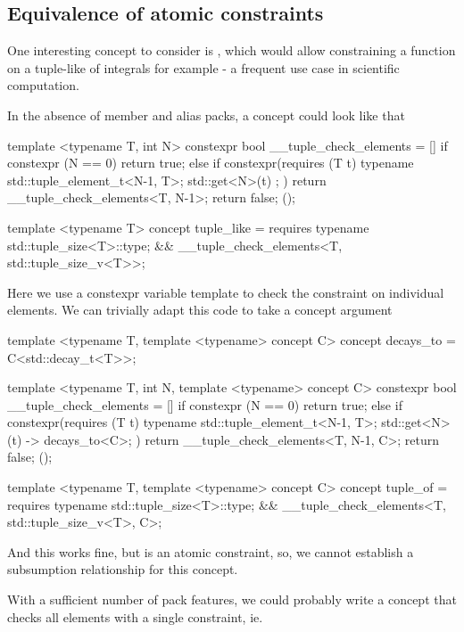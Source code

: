\documentclass{wg21}
\begin{document}
\subsection{Equivalence of atomic constraints}

One interesting concept to consider is , which would allow constraining a function on a tuple-like of integrals for example - a frequent use case in scientific computation.

In the absence of member and alias packs, a  concept could look like that

\begin{colorblock}
template <typename T, int N>
constexpr bool __tuple_check_elements = [] {
    if constexpr (N == 0)
      return true;
    else if constexpr(requires (T t) {
        typename std::tuple_element_t<N-1, T>;
        { std::get<N>(t) };
    })
      return  __tuple_check_elements<T, N-1>;
    return false;
}();

template <typename T>
concept tuple_like = requires {
    typename std::tuple_size<T>::type;
} &&  __tuple_check_elements<T, std::tuple_size_v<T>>;
\end{colorblock}

Here we use a constexpr variable template to check the constraint on individual elements.
We can trivially adapt this code to take a concept argument

\begin{colorblock}
template <typename T, template <typename> concept C>
concept decays_to = C<std::decay_t<T>>;

template <typename T, int N, template <typename> concept C>
constexpr bool __tuple_check_elements = [] {
    if constexpr (N == 0)
      return true;
    else if constexpr(requires (T t) {
        typename std::tuple_element_t<N-1, T>;
        { std::get<N>(t) } -> decays_to<C>;
    })
      return  __tuple_check_elements<T, N-1, C>;
    return false;
}();

template <typename T, template <typename> concept C>
concept tuple_of = requires {
    typename std::tuple_size<T>::type;
} &&  __tuple_check_elements<T, std::tuple_size_v<T>, C>;
\end{colorblock}

And this works fine, but  is an atomic constraint, so, we cannot
establish a subsumption relationship for this concept.

With a sufficient number of pack features, we could probably write a concept that checks all elements with a single constraint,
ie.
\end{document}
